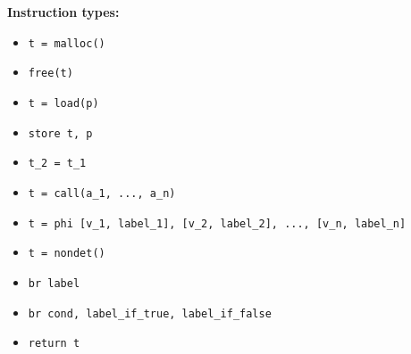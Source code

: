 \documentclass{article}
\def\tbf{\textbf}
\begin{document}
\tbf{Instruction types:}
\begin{itemize}
\item \verb|t = malloc()|
\item \verb|free(t)|
\item \verb|t = load(p)|
\item \verb|store t, p|
\item \verb|t_2 = t_1|
\item \verb|t = call(a_1, ..., a_n)|
\item \verb|t = phi [v_1, label_1], [v_2, label_2], ..., [v_n, label_n]|
\item \verb|t = nondet()|
\item \verb|br label|
\item \verb|br cond, label_if_true, label_if_false|
\item \verb|return t|
\end{itemize}
\end{document}
